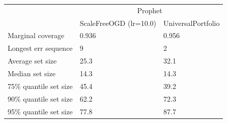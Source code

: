 \begin{tabular}{lll}
\toprule
& \multicolumn{2}{c}{Prophet} \\
& ScaleFreeOGD (lr=10.0) & UniversalPortfolio \\
\midrule
Marginal coverage & 0.936 & 0.956 \\
Longest err sequence & 9 & 2 \\
Average set size & 25.3 & 32.1 \\
Median set size & 14.3 & 14.3 \\
75\% quantile set size & 45.4 & 39.2 \\
90\% quantile set size & 62.2 & 72.3 \\
95\% quantile set size & 77.8 & 87.7 \\
\bottomrule
\end{tabular}
